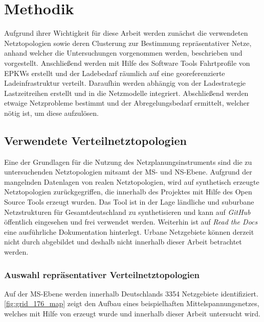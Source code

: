 \section{Methodik}\label{chap:Methodik}

Aufgrund ihrer Wichtigkeit für diese Arbeit werden zunächst die verwendeten Netztopologien sowie deren Clusterung zur Bestimmung repräsentativer Netze, anhand welcher die Untersuchungen vorgenommen werden, beschrieben und vorgestellt.
Anschließend werden mit Hilfe des Software Tools  Fahrtprofile von \glspl{EPKW} erstellt und der Ladebedarf räumlich auf eine georeferenzierte Ladeinfrastruktur verteilt.
Daraufhin werden abhängig von der Ladestrategie Lastzeitreihen erstellt und in die Netzmodelle integriert.
Abschließend werden etwaige Netzprobleme bestimmt und der Abregelungsbedarf ermittelt, welcher nötig ist, um diese aufzulösen.


\subsection{Verwendete Verteilnetztopologien}\label{chap:dingo_theo}

Eine der Grundlagen für die Nutzung des Netzplanungsinstruments  sind die zu untersuchenden Netztopologien mitsamt der \gls{MS}- und \gls{NS}-Ebene.
Aufgrund der mangelnden Datenlagen von realen Netztopologien, wird auf synthetisch erzeugte Netztopologien zurückgegriffen, die innerhalb des  Projektes \cite{Mueller2019} mit Hilfe des Open Source Tools  erzeugt wurden.
Das Tool ist in der Lage ländliche und suburbane Netzstrukturen für Gesamtdeutschland zu synthetisieren und kann auf \textit{GitHub} \cite{dingo2019} öffentlich eingesehen und frei verwendet werden.
Weiterhin ist auf \textit{Read the Docs} \cite{dingo-docs2019} eine ausführliche Dokumentation hinterlegt.
Urbane Netzgebiete können derzeit nicht durch  abgebildet und deshalb nicht innerhalb dieser Arbeit betrachtet werden.\medskip


\subsubsection{Auswahl repräsentativer Verteilnetztopologien}

Auf der \gls{MS}-Ebene werden innerhalb Deutschlands \num{3354} Netzgebiete \cite{Schachler} identifiziert.
\autoref{fig:grid_176_map} zeigt den Aufbau eines beispielhaften Mittelspannungsnetzes, welches mit Hilfe von  erzeugt wurde und innerhalb dieser Arbeit untersucht wird.

